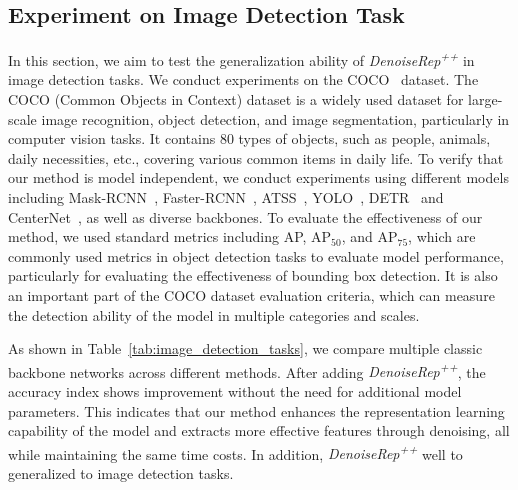 \documentclass[conference]{IEEEtran}
\begin{document}
{\subsection{Experiment on Image Detection Task} 
\label{sec: Experiment on Image Detection Task}
In this section, we aim to test the generalization ability of \textit{DenoiseRep\textsuperscript{++}} in image detection tasks. We conduct experiments on the COCO~\cite{karpathy2015deep} dataset. The COCO (Common Objects in Context) dataset is a widely used dataset for large-scale image recognition, object detection, and image segmentation, particularly in computer vision tasks. It contains 80 types of objects, such as people, animals, daily necessities, etc., covering various common items in daily life. To verify that our method is model independent, we conduct experiments using different models including Mask-RCNN~\cite{he2017mask}, Faster-RCNN~\cite{ren2015faster}, ATSS~\cite{zhang2020bridging}, YOLO~\cite{redmon2018yolov3}, DETR~\cite{carion2020end} and CenterNet~\cite{zhou2019objects}, as well as diverse backbones. To evaluate the effectiveness of our method, we used standard metrics including AP, AP$_{50}$, and AP$_{75}$, which are commonly used metrics in object detection tasks to evaluate model performance, particularly for evaluating the effectiveness of bounding box detection. It is also an important part of the COCO dataset evaluation criteria, which can measure the detection ability of the model in multiple categories and scales.


As shown in Table~\ref{tab:image_detection_tasks}, we compare multiple classic backbone networks across different methods. After adding \textit{DenoiseRep\textsuperscript{++}}, the accuracy index shows improvement without the need for additional model parameters. This indicates that our method enhances the representation learning capability of the model and extracts more effective features through denoising, all while maintaining the same time costs. In addition, \textit{DenoiseRep\textsuperscript{++}} well to generalized to image detection tasks.



}
\end{document}
